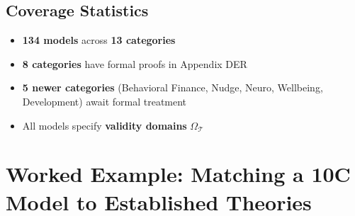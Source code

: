 \subsection{Coverage Statistics}

\begin{itemize}
    \item \textbf{134 models} across \textbf{13 categories}
    \item \textbf{8 categories} have formal proofs in Appendix DER
    \item \textbf{5 newer categories} (Behavioral Finance, Nudge, Neuro, Wellbeing,
          Development) await formal treatment
    \item All models specify \textbf{validity domains} $\Omega_\mathcal{T}$
\end{itemize}

\section{Worked Example: Matching a 10C Model to Established Theories}
\label{sec:ms-worked-example}

